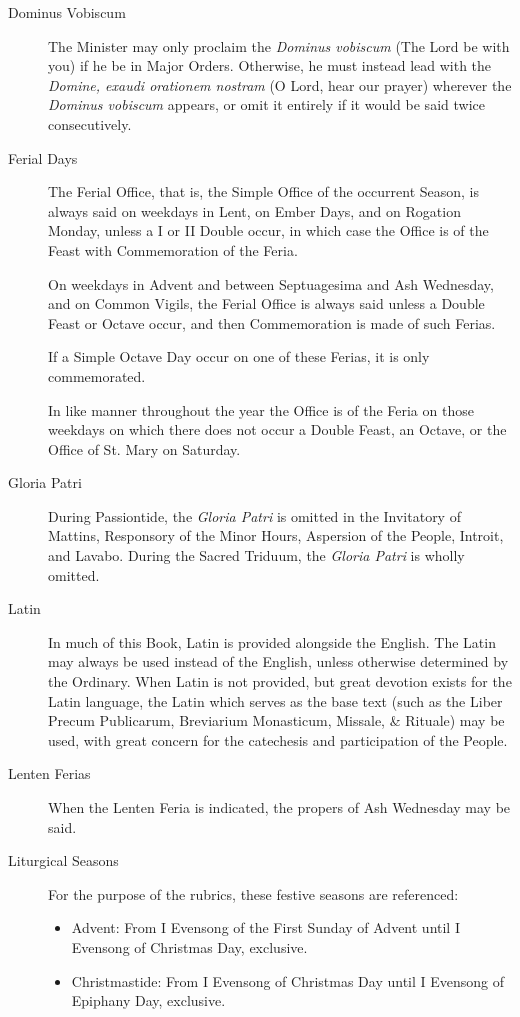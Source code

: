 \begin{description}
\item[Dominus Vobiscum] The Minister may only proclaim the \emph{Dominus vobiscum} (The Lord be with you) if he be in Major Orders. Otherwise, he must instead lead with the \emph{Domine, exaudi orationem nostram} (O Lord, hear our prayer) wherever the \emph{Dominus vobiscum} appears, or omit it entirely if it would be said twice consecutively.
\item[Ferial Days] The Ferial Office, that is, the Simple Office of the occurrent Season, is always said on weekdays in Lent, on Ember Days, and on Rogation Monday, unless a I or II Double occur, in which case the Office is of the Feast with Commemoration of the Feria.\par
On weekdays in Advent and between Septuagesima and Ash Wednesday, and on Common Vigils, the Ferial Office is always said unless a Double Feast or Octave occur, and then Commemoration is made of such Ferias.\par
If a Simple Octave Day occur on one of these Ferias, it is only commemorated.\par
In like manner throughout the year the Office is of the Feria on those weekdays on which there does not occur a Double Feast, an Octave, or the Office of St. Mary on Saturday.
\item[Gloria Patri] During Passiontide, the \emph{Gloria Patri} is omitted in the Invitatory of Mattins, Responsory of the Minor Hours, Aspersion of the People, Introit, and Lavabo. During the Sacred Triduum, the \emph{Gloria Patri} is wholly omitted.
\item[Latin] In much of this Book, Latin is provided alongside the English. The Latin may always be used instead of the English, unless otherwise determined by the Ordinary. When Latin is not provided, but great devotion exists for the Latin language, the Latin which serves as the base text (such as the Liber Precum Publicarum, Breviarium Monasticum, Missale, \& Rituale) may be used, with great concern for the catechesis and participation of the People.
\item[Lenten Ferias] When the Lenten Feria is indicated, the propers of Ash Wednesday may be said.
\item[Liturgical Seasons] For the purpose of the rubrics, these festive seasons are referenced:
    \begin{itemize}
    	\item Advent: From I Evensong of the First Sunday of Advent until I Evensong of Christmas Day, exclusive.
        \item Christmastide: From I Evensong of Christmas Day until I Evensong of Epiphany Day, exclusive.%

\end{itemize}
\end{description}
